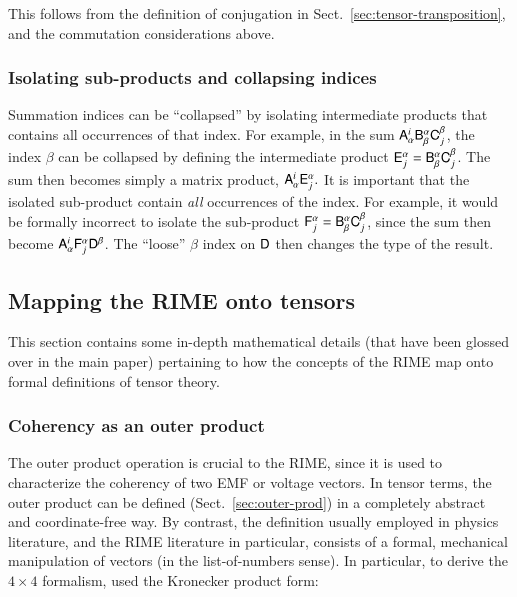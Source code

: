 \documentclass[]{aa}
\begin{document}
This follows from the definition of conjugation in Sect.~\ref{sec:tensor-transposition}, and the commutation considerations above.

\subsubsection{Isolating sub-products and collapsing indices}

Summation indices can be ``collapsed'' by isolating intermediate products that contains all occurrences of that index.
For example, in the sum $\mathsf{A}_{\alpha}^{i}\mathsf{B}_{\beta}^{\alpha}\mathsf{C}_{j}^{\beta}$, the index $\beta$ can be collapsed by defining the intermediate product $\mathsf{E}_{j}^{\alpha}=\mathsf{B}_{\beta}^{\alpha}\mathsf{C}_{j}^{\beta}$. The sum then becomes simply a matrix product, $\mathsf{A}_{\alpha}^{i}\mathsf{E}_{j}^{\alpha}.$ It is important that the isolated sub-product contain \emph{all} occurrences of the index. For example, it would be formally incorrect to isolate the sub-product $\mathsf{F}_{j}^{\alpha}=\mathsf{B}_{\beta}^{\alpha}\mathsf{C}_{j}^{\beta}$, since the sum then become $\mathsf{A}_{\alpha}^{i}\mathsf{F}_{j}^{\alpha}\mathsf{D}^{\beta}$. The ``loose'' $\beta$ index on $\mathsf{D}$ then changes the type of the result.

\subsection{Mapping the RIME onto tensors}

This section contains some in-depth mathematical details (that have been glossed over in the main paper) pertaining to how the concepts of the RIME map onto formal definitions of tensor theory.

\subsubsection{Coherency as an outer product}
\label{sec:coh-outer-prod}

The outer product operation is crucial to the RIME, since it is used to characterize the coherency of two EMF or voltage vectors.  In tensor terms, the outer product can be defined (Sect.~\ref{sec:outer-prod}) in a completely abstract and coordinate-free way. By contrast, the definition usually employed in physics literature, and the RIME literature in particular, consists of a formal, mechanical manipulation of vectors (in the list-of-numbers sense). In particular, to derive the $4\times4$ formalism, \citet{ME1} \citep[see also Paper I,][Sect.~6.1]{RRIME1} used the Kronecker product form:
\end{document}
